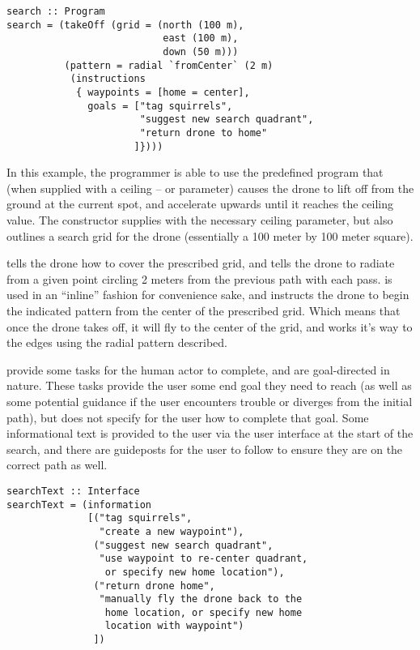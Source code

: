 \documentclass{sig-alternate-05-2015}
\begin{document}
\begin{lstlisting}[breaklines=true]
search :: Program
search = (takeOff (grid = (north (100 m),
                           east (100 m),
                           down (50 m)))
          (pattern = radial `fromCenter` (2 m)
           (instructions
            { waypoints = [home = center],
              goals = ["tag squirrels",
                       "suggest new search quadrant",
                       "return drone to home"
                      ]})))
\end{lstlisting}

In this example, the programmer is able to use the predefined 
program that (when supplied with a ceiling -- or  parameter) causes
the drone to lift off from the ground at the current spot, and accelerate
upwards until it reaches the ceiling value. The  constructor
supplies  with the necessary ceiling parameter, but also
outlines a search grid for the drone (essentially a 100 meter by 100 meter
square).

 tells the drone how to cover the prescribed grid, and
 tells the drone to radiate from a given point circling
2 meters from the previous path with each pass.  is used in
an ``inline'' fashion for convenience sake, and instructs the drone to begin
the indicated pattern from the center of the prescribed grid. Which means that
once the drone takes off, it will fly to the center of the grid, and works
it's way to the edges using the radial pattern described.

 provide some tasks for the human actor to complete, and
are goal-directed in nature. These tasks provide the user some end goal they
need to reach (as well as some potential guidance if the user encounters
trouble or diverges from the initial path), but does not specify for the user
how to complete that goal. Some informational text is provided to the user via
the user interface at the start of the search, and there are guideposts for
the user to follow to ensure they are on the correct path as well.

\begin{lstlisting}
searchText :: Interface
searchText = (information
              [("tag squirrels",
                "create a new waypoint"),
               ("suggest new search quadrant",
                "use waypoint to re-center quadrant,
                 or specify new home location"),
               ("return drone home",
                "manually fly the drone back to the
                 home location, or specify new home
                 location with waypoint")
               ])
\end{lstlisting}
\end{document}
